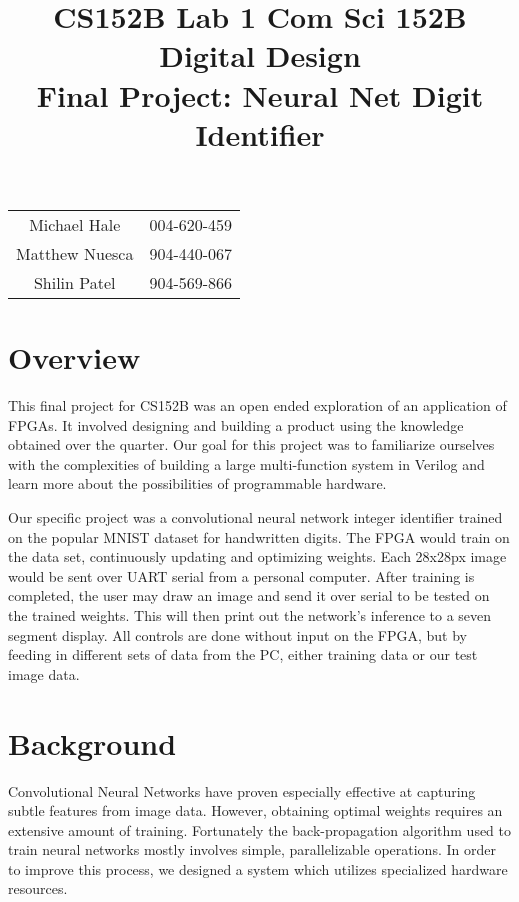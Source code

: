 \documentclass[11pt]{article}
\title{CS152B Lab 1}
\begin{document}
	
\title{\vspace{-0.5in} Com Sci 152B Digital Design \\
	Final Project: Neural Net Digit Identifier }
\date{}
\maketitle
\vspace{-0.75in}
\begin{center}
	\begin{tabular}{cc}
		Michael Hale & 004-620-459 \\ 
		Matthew Nuesca & 904-440-067 \\ 
		Shilin Patel & 904-569-866
	\end{tabular}
\end{center}

\section{Overview}
This final project for CS152B was an open ended exploration of an application of FPGAs. It involved designing and building a product using the knowledge obtained over the quarter. Our goal for this project was to familiarize ourselves with the complexities of building a large multi-function system in Verilog and learn more about the possibilities of programmable hardware.

Our specific project was a convolutional neural network integer identifier trained on the popular MNIST dataset for handwritten digits. The FPGA would train on the data set, continuously updating and optimizing weights. Each 28x28px image would be sent over UART serial from a personal computer. After training is completed, the user may draw an image and send it over serial to be tested on the trained weights. This will then print out the network's inference to a seven segment display. All controls are done without input on the FPGA, but by feeding in different sets of data from the PC, either training data or our test image data.

\section{Background}

Convolutional Neural Networks have proven especially effective at capturing subtle features from image data. However, obtaining optimal weights requires an extensive amount of training. Fortunately the back-propagation algorithm used to train neural networks mostly involves simple, parallelizable operations. In order to improve this process, we designed a system which utilizes specialized hardware resources.
\end{document}
